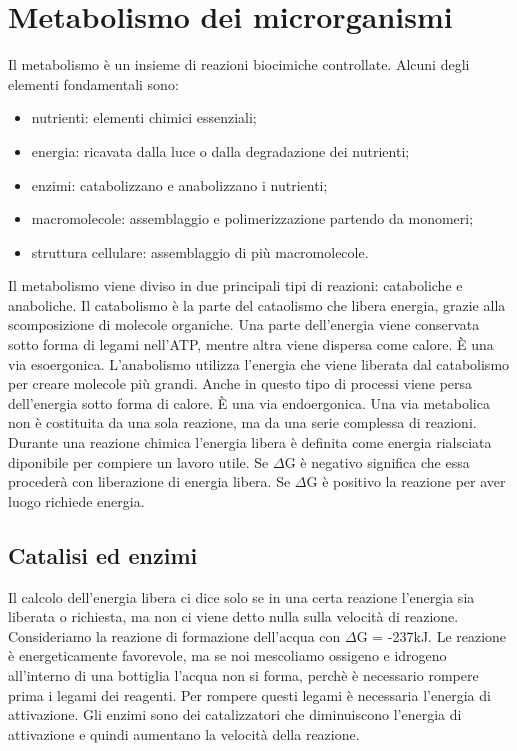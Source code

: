 \chapter{Metabolismo dei microrganismi}
Il metabolismo \`e un insieme di reazioni biocimiche controllate. Alcuni degli elementi fondamentali sono:
\begin{itemize}
    \item nutrienti: elementi chimici essenziali; 
    \item energia: ricavata dalla luce o dalla degradazione dei nutrienti;
    \item enzimi: catabolizzano e anabolizzano i nutrienti;
    \item macromolecole: assemblaggio e polimerizzazione partendo da monomeri; 
    \item struttura cellulare: assemblaggio di pi\`u macromolecole. 
\end{itemize}
Il metabolismo viene diviso in due principali tipi di reazioni: cataboliche e anaboliche. 
Il catabolismo \`e la parte del cataolismo che libera energia, grazie alla scomposizione di molecole organiche. Una parte dell'energia viene conservata sotto forma di legami nell'ATP, mentre altra viene dispersa come calore. \`E una via esoergonica.
L'anabolismo utilizza l'energia che viene liberata dal catabolismo per creare molecole pi\`u grandi. Anche in questo tipo di processi viene persa dell'energia sotto forma di calore. \`E una via endoergonica.
Una via metabolica non \`e costituita da una sola reazione, ma da una serie complessa di reazioni. Durante una reazione chimica l'energia libera \`e definita come energia rialsciata diponibile per compiere un lavoro utile. 
Se ${\Delta}$G \`e negativo significa che essa proceder\`a con liberazione di energia libera.
Se ${\Delta}$G \`e positivo la reazione per aver luogo richiede energia.
\section{Catalisi ed enzimi}
Il calcolo dell'energia libera ci dice solo se in una certa reazione l'energia sia liberata o richiesta, ma non ci viene detto nulla sulla velocit\`a di reazione.
Consideriamo la reazione di formazione dell'acqua con ${\Delta}$G = -237kJ. Le reazione \`e energeticamente favorevole, ma se noi mescoliamo ossigeno e idrogeno all'interno di una bottiglia l'acqua non si forma, perch\`e \`e necessario rompere prima i legami dei reagenti. Per rompere questi legami \`e necessaria l'energia di attivazione. Gli enzimi sono dei catalizzatori che diminuiscono l'energia di attivazione e quindi aumentano la velocit\`a della reazione.
